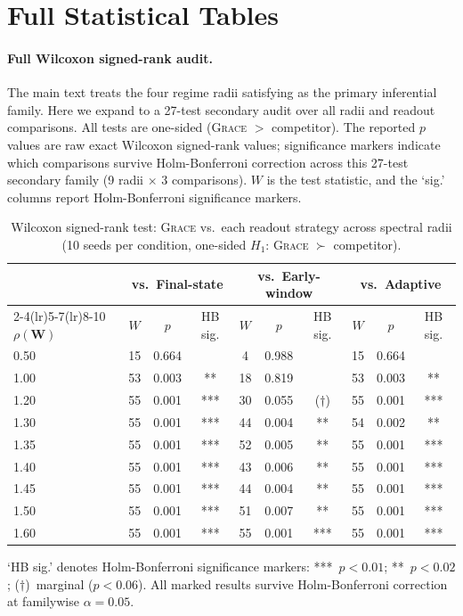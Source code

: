 \documentclass{article}
\theoremstyle{remark}
\newcommand{\bW}{\mathbf{W}}
\newcommand{\grace}{\textnormal{\textsc{Grace}}}
\newcommand{\sr}{\rho(\bW)}
\begin{document}
\section{Full Statistical Tables}
\label{app:stats}

\paragraph{Full Wilcoxon signed-rank audit.}
The main text treats the four regime radii satisfying  as
the primary inferential family. Here we expand to a 27-test secondary audit
over all radii and readout comparisons. All tests are one-sided (\grace{}
$>$ competitor). The reported $p$ values are raw exact Wilcoxon signed-rank
values; significance markers indicate which comparisons survive
Holm-Bonferroni correction across this 27-test secondary family
(9 radii $\times$ 3 comparisons). $W$ is the test statistic, and the `sig.'
columns report Holm-Bonferroni significance markers.

\begin{table}[H]
\centering
\caption{Wilcoxon signed-rank test: \grace{} vs.~each readout strategy across
spectral radii (10 seeds per condition, one-sided $H_1$: \grace{} $\succ$ competitor).}
\label{tab:wilcoxon}
\small
\begin{tabular}{l ccc ccc ccc}
\toprule
 & \multicolumn{3}{c}{vs.~Final-state} & \multicolumn{3}{c}{vs.~Early-window} & \multicolumn{3}{c}{vs.~Adaptive} \\
\cmidrule(lr){2-4}\cmidrule(lr){5-7}\cmidrule(lr){8-10}
$\sr$ & $W$ & $p$ & HB sig. & $W$ & $p$ & HB sig. & $W$ & $p$ & HB sig. \\
\midrule
0.50 & 15 & 0.664 & & 4  & 0.988 & & 15 & 0.664 & \\
1.00 & 53 & 0.003 & ** & 18 & 0.819 & & 53 & 0.003 & ** \\
1.20 & 55 & 0.001 & *** & 30 & 0.055 & ($\dagger$) & 55 & 0.001 & *** \\
1.30 & 55 & 0.001 & *** & 44 & 0.004 & ** & 54 & 0.002 & ** \\
1.35 & 55 & 0.001 & *** & 52 & 0.005 & ** & 55 & 0.001 & *** \\
1.40 & 55 & 0.001 & *** & 43 & 0.006 & ** & 55 & 0.001 & *** \\
1.45 & 55 & 0.001 & *** & 44 & 0.004 & ** & 55 & 0.001 & *** \\
1.50 & 55 & 0.001 & *** & 51 & 0.007 & ** & 55 & 0.001 & *** \\
1.60 & 55 & 0.001 & *** & 55 & 0.001 & *** & 55 & 0.001 & *** \\
\bottomrule
\end{tabular}
\end{table}
\noindent
`HB sig.' denotes Holm-Bonferroni significance markers:
***~$p < 0.01$; **~$p < 0.02$; ($\dagger$)~marginal ($p < 0.06$).
All marked results survive Holm-Bonferroni correction at familywise
$\alpha = 0.05$.
\end{document}
